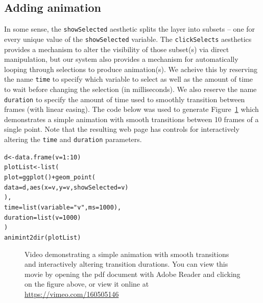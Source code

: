 \documentclass[journal]{vgtc}\usepackage[]{graphicx}\usepackage[]{color}
\makeatletter
\newcommand{\hlnum}[1]{\textcolor[rgb]{0,0,0}{#1}}%
\newcommand{\hlstr}[1]{\textcolor[rgb]{0.502,0,0}{#1}}%
\newcommand{\hlopt}[1]{\textcolor[rgb]{0,0,0}{#1}}%
\newcommand{\hlstd}[1]{\textcolor[rgb]{0,0,0}{#1}}%
\newcommand{\hlkwb}[1]{\textcolor[rgb]{0,0,0}{#1}}%
\newcommand{\hlkwc}[1]{\textcolor[rgb]{0,0,1}{#1}}%
\newcommand{\hlkwd}[1]{\textcolor[rgb]{0,0,0}{#1}}%
\newenvironment{kframe}{%
 \def\at@end@of@kframe{}%
 \ifinner\ifhmode%
  \def\at@end@of@kframe{\end{minipage}}%
  \begin{minipage}{\columnwidth}%
 \fi\fi%
 \def\FrameCommand##1{\hskip\@totalleftmargin \hskip-\fboxsep
 \colorbox{shadecolor}{##1}\hskip-\fboxsep
     \hskip-\linewidth \hskip-\@totalleftmargin \hskip\columnwidth}%
 \MakeFramed {\advance\hsize-\width
   \@totalleftmargin\z@ \linewidth\hsize
   \@setminipage}}%
 {\par\unskip\endMakeFramed%
 \at@end@of@kframe}
\newenvironment{knitrout}{}{} %
\makeatother
\begin{document}
\subsection{Adding animation}
\label{sec:animation}

In some sense, the \texttt{showSelected} aesthetic splits the layer into subsets
-- one for every unique value of the \texttt{showSelected} variable. The 
\texttt{clickSelects} aesthetics provides a mechanism to alter the visibility 
of those subset(s) via direct manipulation, but our system also provides a 
mechanism for automatically looping through selections to produce animation(s).
We acheive this by reserving the name \texttt{time} to specify which variable 
to select as well as the amount of time to wait before changing the selection 
(in milliseconds). We also reserve the name \texttt{duration} to specify the 
amount of time used to smoothly transition between frames (with linear easing). 
The code below was used to generate Figure~\ref{fig:animation} which 
demonstrates a simple animation with smooth transitions between 10 frames of a
single point. Note that the resulting web page has controls for interactively
altering the \texttt{time} and \texttt{duration} parameters. 

\begin{knitrout}
\color{fgcolor}\begin{kframe}
\begin{alltt}
\hlstd{d} \hlkwb{<-} \hlkwd{data.frame}\hlstd{(}\hlkwc{v} \hlstd{=} \hlnum{1}\hlopt{:}\hlnum{10}\hlstd{)}
\hlstd{plotList} \hlkwb{<-} \hlkwd{list}\hlstd{(}
  \hlkwc{plot} \hlstd{=} \hlkwd{ggplot}\hlstd{()} \hlopt{+} \hlkwd{geom_point}\hlstd{(}
    \hlkwc{data} \hlstd{= d,} \hlkwd{aes}\hlstd{(}\hlkwc{x}\hlstd{=v,} \hlkwc{y}\hlstd{=v,} \hlkwc{showSelected}\hlstd{=v)}
  \hlstd{),}
  \hlkwc{time} \hlstd{=} \hlkwd{list}\hlstd{(}\hlkwc{variable} \hlstd{=} \hlstr{"v"}\hlstd{,} \hlkwc{ms} \hlstd{=} \hlnum{1000}\hlstd{),}
  \hlkwc{duration} \hlstd{=} \hlkwd{list}\hlstd{(}\hlkwc{v} \hlstd{=} \hlnum{1000}\hlstd{)}
\hlstd{)}
\hlkwd{animint2dir}\hlstd{(plotList)}
\end{alltt}
\end{kframe}
\end{knitrout}


\begin{figure}[htp]
	\centerline{}
	\label{fig:animation}
	\caption{Video demonstrating a simple animation with smooth transitions and interactively altering transition durations. You can view this movie by opening the pdf document with Adobe Reader and clicking on the figure above, or view it online at \url{https://vimeo.com/160505146}}
\end{figure}
\end{document}
